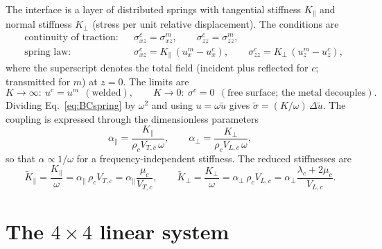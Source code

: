 \documentclass[11pt,a4paper]{article}
\begin{document}
The interface is a layer of distributed springs with tangential stiffness $K_\parallel$ and
normal stiffness $K_\perp$ (stress per unit relative displacement). The conditions are
\begin{align}
  &\text{continuity of traction:} && \sigma^{c}_{xz}=\sigma^{m}_{xz},\qquad \sigma^{c}_{zz}=\sigma^{m}_{zz},
  \label{eq:BCtraction}\\
  &\text{spring law:} && \sigma^{c}_{xz}=K_\parallel\,(u^{m}_x-u^{c}_x),\qquad
  \sigma^{c}_{zz}=K_\perp\,(u^{m}_z-u^{c}_z),
  \label{eq:BCspring}
\end{align}
where the superscript denotes the total field (incident plus reflected for $c$; transmitted
for $m$) at $z=0$. The limits are
\begin{equation}
  K\to\infty:\ u^c=u^m\ \ (\text{welded}),\qquad
  K\to0:\ \sigma^c=0\ \ (\text{free surface; the metal decouples}).
\end{equation}
Dividing Eq.~\eqref{eq:BCspring} by $\omega^2$ and using $u=\omega\tilde u$ gives
$\tilde\sigma=(K/\omega)\,\Delta\tilde u$. The coupling is expressed through the dimensionless parameters
\begin{equation}
  \alpha_\parallel=\frac{K_\parallel}{\rho_cV_{T,c}\,\omega},\qquad
  \alpha_\perp=\frac{K_\perp}{\rho_cV_{L,c}\,\omega},
  \label{eq:alpha_omega}
\end{equation}
so that $\alpha\propto1/\omega$ for a frequency-independent stiffness. The reduced stiffnesses are
\begin{equation}
  \tilde K_\parallel=\frac{K_\parallel}{\omega}=\alpha_\parallel\,\rho_cV_{T,c}
  =\alpha_\parallel\frac{\mu_c}{V_{T,c}},
  \qquad
  \tilde K_\perp=\frac{K_\perp}{\omega}=\alpha_\perp\,\rho_cV_{L,c}
  =\alpha_\perp\frac{\lambda_c+2\mu_c}{V_{L,c}} .
  \label{eq:alpha_reduced}
\end{equation}

\section{The $4\times4$ linear system}
\end{document}
